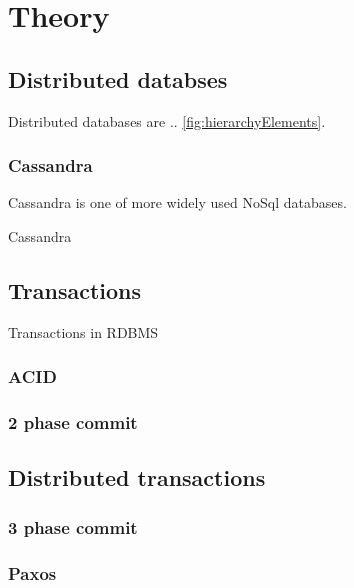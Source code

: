 
\chapter{Theory}\label{chapter:theory}

\section{Distributed databses}\label{sec:theory:distDbs}
Distributed databases are .. \ref{fig:hierarchyElements}. \cite{CassandraDataStaxDocs} \cite{chandra2007PaxosMadeLive} \cite{lamport1982byzantine}

\subsection{Cassandra}
Cassandra is one of more widely used NoSql databases. 

Cassandra


\section{Transactions}\label{sec:theory:transactions}
Transactions in RDBMS

\subsection{ACID}

\subsection{2 phase commit}

\section{Distributed transactions}

\subsection{3 phase commit}

\subsection{Paxos}

